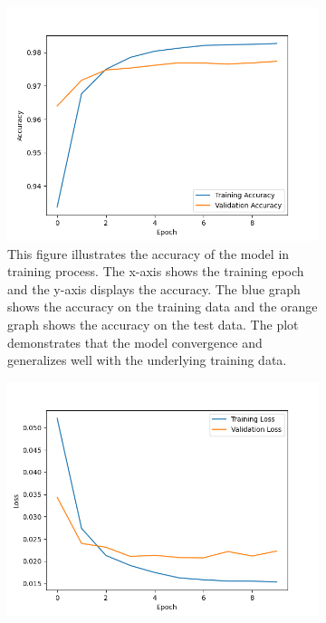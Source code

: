 \begin{figure}[ht!]  
  \centering
  \begin{subfigure}[b]{.47\textwidth}
      \centering
      \includegraphics[width=\linewidth ]{images/Model2Acc.png}
      \caption{This figure illustrates the accuracy of the model in training process. The x-axis shows the training epoch and the y-axis 
      displays the accuracy. The blue graph shows the accuracy on the training data and the orange graph shows the accuracy on the test data.
    The plot demonstrates that the model convergence and generalizes well with the underlying training data.}
      \label{fig:accM2}
  \end{subfigure}
  \hfill
  \begin{subfigure}[b]{.47\textwidth}
      \centering
      \includegraphics[width=\linewidth, keepaspectratio]{images/M2_Loss_Fin.png}

\end{subfigure}
\end{figure}
